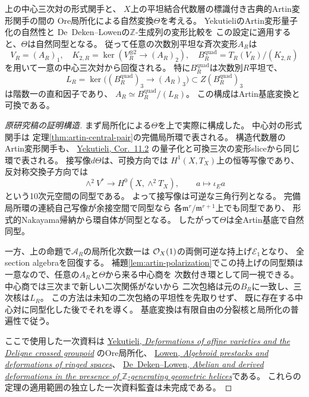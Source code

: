 \begin{theorem}
\label{thm:artin-quadratic-cover}
上の中心三次対の形式関手と、
$X$上の平坦結合代数層の標識付き古典的Artin変形関手の間の
Ore局所化による自然変換$\Theta$を考える。
YekutieliのArtin変形量子化の自然性と
De~Deken--Lowenの$\mathbb Z$-生成列の変形比較を
この設定に適用すると、$\Theta$は自然同型となる。
従って任意の次数別平坦な斉次変形$A_R$は
\[
 V_R=(A_R)_1,\quad
 K_{2,R}=\ker(V_R^{\otimes2}\to(A_R)_2),\quad
 B_R^{\mathrm{quad}}=T_R(V_R)/(K_{2,R})
\]
を用いて一意の中心三次対から回復される。
特に$B_R^{\mathrm{quad}}$は次数別$R$平坦で、
\[
 L_R=\ker\bigl((B_R^{\mathrm{quad}})_3\to(A_R)_3\bigr)
 \subset Z(B_R^{\mathrm{quad}})_3
\]
は階数一の直和因子であり、
$A_R\simeq B_R^{\mathrm{quad}}/(L_R)$。
この構成はArtin基底変換と可換である。
\end{theorem}
\begin{proof}[原研究稿の証明構造]
まず局所化による$\Theta$を上で実際に構成した。
中心対の形式関手は
定理\ref{thm:artin-central-pair}の完備局所環で表される。
構造代数層のArtin変形関手も、
\href{https://arxiv.org/abs/0905.0488}{Yekutieli, Cor.~11.2}
の量子化と可換三次の変形sliceから同じ環で表される。
接写像$d\Theta$は、可換方向では
$H^1(X,T_X)$上の恒等写像であり、
反対称交換子方向では
\[
 \wedge^2V^*\longrightarrow H^0(X,\wedge^2T_X),
 \qquad a\longmapsto\iota_Ea
\]
という10次元空間の同型である。
よって接写像は可逆な三角行列となる。
完備局所環の連続自己写像が余接空間で同型なら
各$\mathfrak m^r/\mathfrak m^{r+1}$上でも同型であり、
形式的Nakayama帰納から環自体が同型となる。
したがって$\Theta$は全Artin基底で自然同型。

一方、上の命題で$\mathscr A_R$の局所化次数一は
$\mathcal O_X(1)$の両側可逆な持上げ$\mathscr E_1$となり、
全section algebraを回復する。
補題\ref{lem:artin-polarization}でこの持上げの同型類は
一意なので、任意の$A_R$と$\Theta$から来る中心商を
次数付き環として同一視できる。
中心商では三次まで新しい二次関係がないから
二次包絡は元の$B_R$に一致し、三次核は$L_R$。
この方法は未知の二次包絡の平坦性を先取りせず、
既に存在する中心対に同型化した後でそれを導く。
基底変換は有限自由の分裂核と局所化の普遍性で従う。

ここで使用した一次資料は
\href{https://arxiv.org/abs/1209.6243}{Yekutieli,
 \emph{Deformations of affine varieties and the Deligne crossed groupoid}}
のOre局所化、
\href{https://arxiv.org/abs/math/0511197}{Lowen,
 \emph{Algebroid prestacks and deformations of ringed spaces}}、
\href{https://arxiv.org/abs/1001.4265}{De~Deken--Lowen,
 \emph{Abelian and derived deformations in the presence of
 $\mathbb Z$-generating geometric helices}}である。
これらの定理の適用範囲の独立した一次資料監査は未完成である。
\end{proof}

